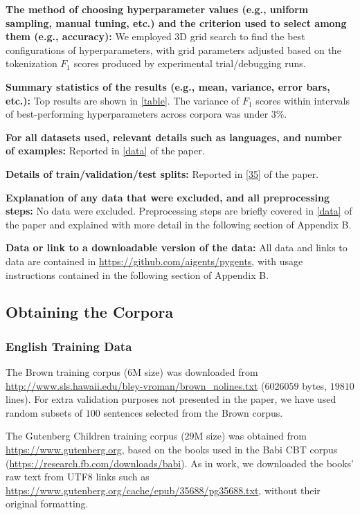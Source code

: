 \documentclass[11pt]{article}
\begin{document}
\textbf{The method of choosing hyperparameter values (e.g., uniform sampling, manual tuning, etc.) and the criterion used to select among them (e.g., accuracy):} We employed 3D grid search to find the best configurations of hyperparameters, with grid parameters adjusted based on the tokenization $F_1$ scores produced by experimental trial/debugging runs.  

\textbf{Summary statistics of the results (e.g., mean, variance, error bars, etc.):} Top results are shown in \autoref{table}. The variance of $F_1$ scores within intervals of best-performing hyperparameters across corpora was under $3$\%.  

\textbf{For all datasets used, relevant details such as languages, and number of examples:} Reported in \autoref{data} of the paper.

\textbf{Details of train/validation/test splits:} Reported in \autoref{35} of the paper.

\textbf{Explanation of any data that were excluded, and all preprocessing steps:} No data were excluded. Preprocessing steps are briefly covered in \autoref{data} of the paper and explained with more detail in the following section of Appendix B. 

\textbf{Data or link to a downloadable version of the data:} All data and links to data are contained in \url{https://github.com/aigents/pygents}, with usage instructions contained in the following section of Appendix B.

\subsection{Obtaining the Corpora}

\subsubsection{English Training Data}

The Brown training corpus ($6$M size) was downloaded from \url{http://www.sls.hawaii.edu/bley-vroman/brown_nolines.txt} ($6026059$ bytes,  $19810$ lines). For extra validation purposes not presented in the paper, we have used random subsets of $100$ sentences selected from the Brown corpus.

The Gutenberg Children training corpus ($29$M size) was obtained from \url{https://www.gutenberg.org}, based on the books used in the Babi CBT corpus (\url{https://research.fb.com/downloads/babi}). As in  work, we downloaded the books’ raw text from UTF8 links such as \url{https://www.gutenberg.org/cache/epub/35688/pg35688.txt}, without their original formatting.
\end{document}

